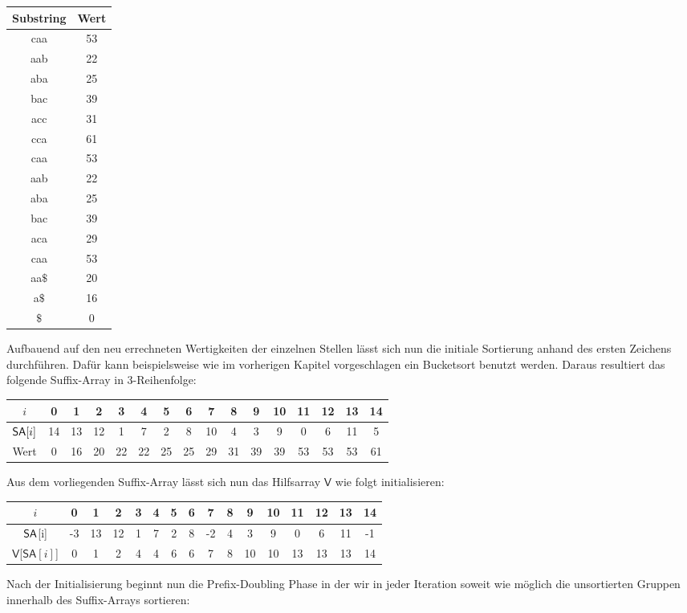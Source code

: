 \begin{center}
\begin{tabular}{c | c}
Substring & Wert \\
\hline
caa & 53 \\
aab & 22 \\
aba & 25 \\
bac & 39 \\
acc & 31 \\
cca & 61 \\
caa & 53 \\
aab & 22 \\
aba & 25 \\
bac & 39 \\
aca & 29 \\
caa & 53 \\
aa$\$$ & 20 \\
a$\$$ & 16 \\
$\$$ & 0 
\end{tabular}
\end{center}

Aufbauend auf den neu errechneten Wertigkeiten der einzelnen Stellen lässt sich nun die initiale Sortierung anhand des ersten Zeichens durchführen. Dafür kann beispielsweise wie im vorherigen Kapitel vorgeschlagen ein Bucketsort benutzt werden. Daraus resultiert das folgende Suffix-Array in 3-Reihenfolge:\\
\begin{center}
\scalebox{0.85}
{
\begin{tabular}{| c | c | c | c | c | c | c | c | c | c | c | c | c | c | c | c |}
\hline
$i$ & 0 & 1 &2 &3 &4 &5 &6 &7 &8 &9 &10 &11 &12 &13 &14 \\
\hline
$\sa[i]$ & 14 & 13 &12 &1 &7 & 2 &8 &10 &4 &3 &9 &0 &6 &11 &5 \\
\hline
Wert & 0 & 16 &20 &22 &22 &25 &25 &29 &31 &39 &39 &53 &53 &53 &61 \\
\hline
\end{tabular}
}
\end{center}
Aus dem vorliegenden Suffix-Array lässt sich nun das Hilfsarray $\mathsf{V}$ wie folgt initialisieren:\\
\begin{center}
\scalebox{0.85}
{
\begin{tabular}{| c | c | c | c | c | c | c | c | c | c | c | c | c | c | c | c |}
\hline
$i$ & 0 & 1 &2 &3 &4 &5 &6 &7 &8 &9 &10 &11 &12 &13 &14 \\
\hline
$\sa$[i] & -3 & 13 &12 &1 &7 & 2 &8 &-2 &4 &3 &9 &0 &6 &11 &-1 \\

$\mathsf{V}$[$\mathsf{SA}[i]$] & 0 & 1 & 2 & 4 & 4 & 6 & 6 & 7 & 8 & 10 & 10 & 13 & 13 & 13 & 14 \\
\hline
\end{tabular}
}
\end{center}
Nach der Initialisierung beginnt nun die Prefix-Doubling Phase in der wir in jeder Iteration soweit wie möglich die unsortierten Gruppen innerhalb des Suffix-Arrays sortieren:

